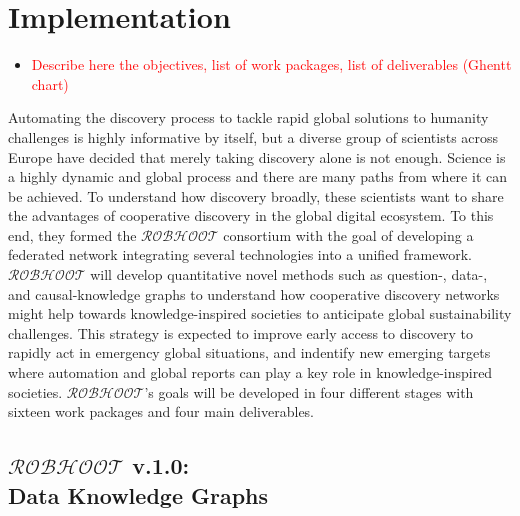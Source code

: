 \documentclass[12pt, a4paper]{article} %
\begin{document}
\section{Implementation}

\begin{itemize}
\item \textcolor{red}{Describe here the objectives, list of work
    packages, list of deliverables (Ghentt chart)}
\end{itemize}
    
Automating the discovery process to tackle rapid global solutions to
humanity challenges is highly informative by itself, but a diverse
group of scientists across Europe have decided that merely taking
discovery alone is not enough. Science is a highly dynamic and global
process and there are many paths from where it can be achieved. To
understand how discovery broadly, these scientists want to share the
advantages of cooperative discovery in the global digital
ecosystem. To this end, they formed the $\mathcal{ROBHOOT}$ consortium
with the goal of developing a federated network integrating several
technologies into a unified framework. $\mathcal{ROBHOOT}$ will
develop quantitative novel methods such as question-, data-, and
causal-knowledge graphs to understand how cooperative discovery
networks might help towards knowledge-inspired societies to anticipate
global sustainability challenges. This strategy is expected to improve
early access to discovery to rapidly act in emergency global
situations, and indentify new emerging targets where automation and
global reports can play a key role in knowledge-inspired
societies. $\mathcal{ROBHOOT}$'s goals will be developed in four
different stages with sixteen work packages and four main
deliverables.

\subsection{{\bf $\mathcal{ROBHOOT}$ v.1.0}: \\ Data Knowledge Graphs}
\end{document}
